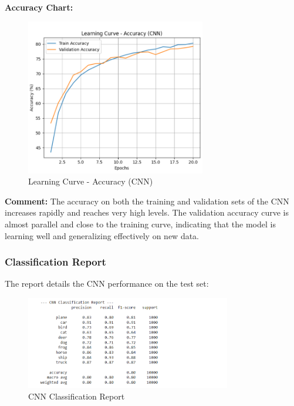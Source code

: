 \documentclass[12pt]{article}
\begin{document}
\textbf{Accuracy Chart:}
\begin{figure}[H]
    \centering
    \includegraphics[width=0.7\textwidth]{Screenshots/Ảnh chụp màn hình 2025-05-23 223550.png} %
    \caption{Learning Curve - Accuracy (CNN)}
    \label{fig:cnn_accuracy_chart}
\end{figure}
\textbf{Comment:} The accuracy on both the training and validation sets of the CNN increases rapidly and reaches very high levels. The validation accuracy curve is almost parallel and close to the training curve, indicating that the model is learning well and generalizing effectively on new data.

\subsubsection{Classification Report}
The report details the CNN performance on the test set:
\begin{figure}[H]
    \centering
    \hspace*{3.5cm}\includegraphics[width=0.8\textwidth]{Screenshots/Ảnh chụp màn hình 2025-05-23 223634.png} %
    \caption{CNN Classification Report}
    \label{fig:cnn_classification_report}
\end{figure}
\end{document}
